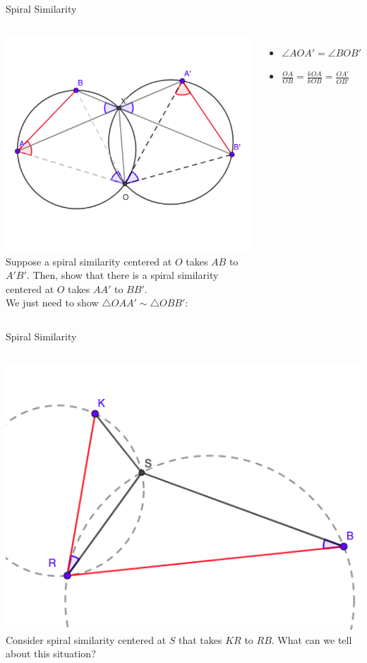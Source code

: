 \documentclass{beamer}
\begin{document}
\begin{frame}{Spiral Similarity}
	\begin{columns}
		\includegraphics[scale=0.37]{spi3.png}
		Suppose a spiral similarity centered at $O$ takes
		$AB$ to $A'B'$. Then, show that there is a spiral 
		similarity centered at $O$ takes $A A'$ to $BB'$.\\
		\phantom{Spacing}
		We just need to show $\triangle OA A'\sim \triangle OBB'$:
		\begin{itemize}
			\item $\angle AOA' = \angle BOB'$
			\item $\frac{OA}{OB} = \frac{kOA}{kOB} = \frac{OA'}{OB'}$
		\end{itemize}
	\end{columns}
\end{frame}
\begin{frame}{Spiral Similarity}
	\begin{columns}
		\column{0.6\textwidth}
		\includegraphics[scale=0.34]{spi4.png}
		\column{0.4\textwidth}
		Consider spiral similarity centered at $S$ that takes
		$KR$ to $RB$. What can we tell about this situation?
	\end{columns}
\end{frame}
\end{document}

